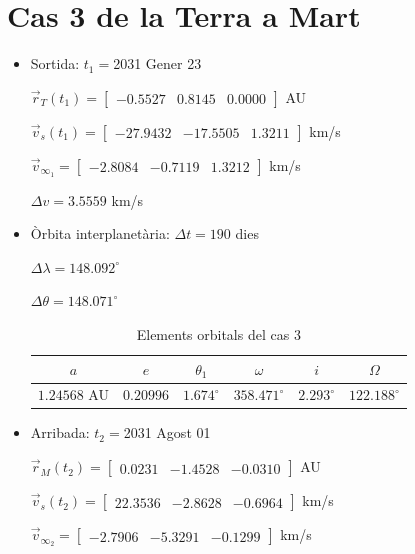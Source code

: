 \section{Cas 3 de la Terra a Mart}
\begin{itemize}
	\item Sortida: $t_{1}=$2031 Gener 23

$\vec{r}_{T}(t_{1})=\begin{bmatrix}-0.5527 & 0.8145 & 0.0000\end{bmatrix}$ AU

$\vec{v}_{s}(t_{1})=\begin{bmatrix}-27.9432 & -17.5505 & 1.3211\end{bmatrix}$ km/s

$\vec{v}_{\infty_{1}}= \begin{bmatrix}-2.8084 & -0.7119 & 1.3212\end{bmatrix}$ km/s

$\Delta v=3.5559$ km/s

	\item Òrbita interplanetària: $\Delta t=190$ dies

$\Delta\lambda=148.092^{\circ}$

$\Delta\theta=148.071^{\circ}$
\begin{table}[h!]
	\centering
	\begin{tabular}{ |c|c|c|c|c|c|}
		\hline
		$a$ & $e$ & $\theta_{1}$ & $\omega$ & $i$ & $\Omega$ \\ \hline
		$1.24568$ AU  & $0.20996$ & $1.674^{\circ}$ & $358.471^{\circ}$ & $2.293^{\circ}$ & $122.188^{\circ}$ \\ \hline
	\end{tabular}
	\caption{Elements orbitals del cas 3}
\end{table}
	\item Arribada: $t_{2}=$2031 Agost 01

$\vec{r}_{M}(t_{2})=\begin{bmatrix}0.0231 & -1.4528 & -0.0310\end{bmatrix}$ AU

$\vec{v}_{s}(t_{2})=\begin{bmatrix}22.3536 & -2.8628 & -0.6964\end{bmatrix}$ km/s


$\vec{v}_{\infty_{2}}=\begin{bmatrix}-2.7906 & -5.3291 & -0.1299\end{bmatrix}$ km/s
\end{itemize}
